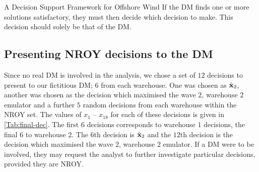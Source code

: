 \begin{chapter}{A Decision Support Framework for Offshore Wind \label{Ch:ds-for-ow}}
If the DM finds one or more solutions satisfactory, they must then decide which decision to make. This decision should solely be that of the DM.
\subsection{Presenting NROY decisions to the DM}
Since no real DM is involved in the analysis, we chose a set of $12$ decisions to present to our fictitious DM; $6$ from each warehouse. One was chosen as $\hat{\mathbf{x}}_2$, another was chosen as the decision which maximised the wave $2$, warehouse $2$ emulator and a further $5$ random decisions from each warehouse within the NROY set. The values of $x_{1}$ -- $x_{18}$ for each of these decisions is given in \cref{Tab:final-dec}. The first $6$ decisions corresponds to warehouse $1$ decisions, the final $6$ to warehouse $2$. The $6$th decision is $\hat{\mathbf{x}}_2$ and the $12$th decision is the decision which maximised the wave $2$, warehouse $2$ emulator. If a DM were to be involved, they may request the analyst to further investigate particular decisions, provided they are NROY.


\end{chapter}

